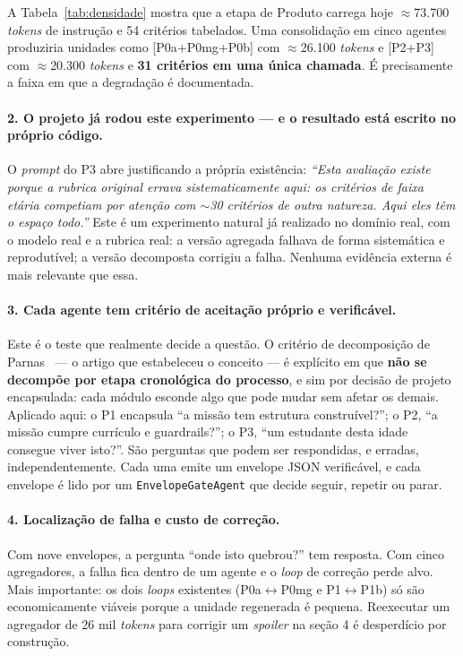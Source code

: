 \documentclass[11pt,a4paper]{article}
\newcommand{\cod}[1]{\texttt{\small #1}}
\begin{document}
A Tabela~\ref{tab:densidade} mostra que a etapa de Produto carrega hoje $\approx$73.700 \textit{tokens} de
instrução e 54 critérios tabelados. Uma consolidação em cinco agentes produziria unidades como
[P0a+P0mg+P0b] com $\approx$26.100 \textit{tokens} e [P2+P3] com $\approx$20.300 \textit{tokens} e
\textbf{31 critérios em uma única chamada}. É precisamente a faixa em que a degradação é documentada.

\paragraph{2. O projeto já rodou este experimento --- e o resultado está escrito no próprio código.}
O \textit{prompt} do P3 abre justificando a própria existência: \textit{``Esta avaliação existe porque a
rubrica original errava sistematicamente aqui: os critérios de faixa etária competiam por atenção com
$\sim$30 critérios de outra natureza. Aqui eles têm o espaço todo.''} Este é um experimento natural já
realizado no domínio real, com o modelo real e a rubrica real: a versão agregada falhava de forma
sistemática e reprodutível; a versão decomposta corrigiu a falha. Nenhuma evidência externa é mais relevante
que essa.

\paragraph{3. Cada agente tem critério de aceitação próprio e verificável.}
Este é o teste que realmente decide a questão. O critério de decomposição de Parnas~\cite{parnas1972} ---
o artigo que estabeleceu o conceito --- é explícito em que \textbf{não se decompõe por etapa cronológica do
processo}, e sim por decisão de projeto encapsulada: cada módulo esconde algo que pode mudar sem afetar os
demais. Aplicado aqui: o P1 encapsula ``a missão tem estrutura construível?''; o P2, ``a missão cumpre
currículo e guardrails?''; o P3, ``um estudante desta idade consegue viver isto?''. São perguntas que podem
ser respondidas, e erradas, independentemente. Cada uma emite um envelope JSON verificável, e cada envelope
é lido por um \cod{EnvelopeGateAgent} que decide seguir, repetir ou parar.

\paragraph{4. Localização de falha e custo de correção.}
Com nove envelopes, a pergunta ``onde isto quebrou?'' tem resposta. Com cinco agregadores, a falha fica
dentro de um agente e o \textit{loop} de correção perde alvo. Mais importante: os dois \textit{loops}
existentes (P0a$\leftrightarrow$P0mg e P1$\leftrightarrow$P1b) só são economicamente viáveis porque a unidade
regenerada é pequena. Reexecutar um agregador de 26 mil \textit{tokens} para corrigir um \textit{spoiler} na
seção 4 é desperdício por construção.
\end{document}
